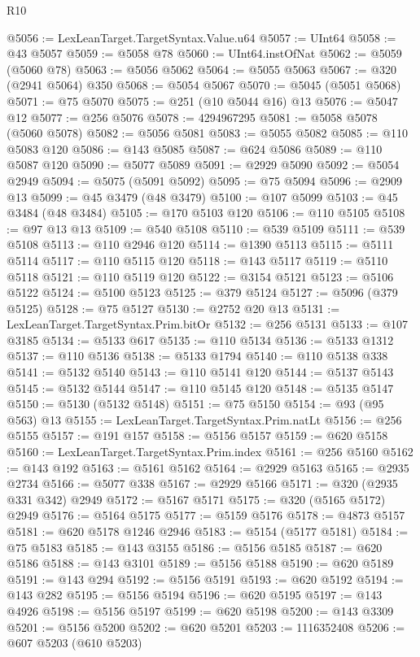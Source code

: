 \begin{lexlean}{R10}
\begin{coremodule}
@5056 := LexLeanTarget.TargetSyntax.Value.u64
@5057 := UInt64
@5058 := @43 @5057
@5059 := @5058 @78
@5060 := UInt64.instOfNat
@5062 := @5059 (@5060 @78)
@5063 := @5056 @5062
@5064 := @5055 @5063
@5067 := @320 (@2941 @5064) @350
@5068 := @5054 @5067
@5070 := @5045 (@5051 @5068)
@5071 := @75 @5070
@5075 := @251 (@10 @5044 @16) @13
@5076 := @5047 @12
@5077 := @256 @5076
@5078 := 4294967295
@5081 := @5058 @5078 (@5060 @5078)
@5082 := @5056 @5081
@5083 := @5055 @5082
@5085 := @110 @5083 @120
@5086 := @143 @5085
@5087 := @624 @5086
@5089 := @110 @5087 @120
@5090 := @5077 @5089
@5091 := @2929 @5090
@5092 := @5054 @2949
@5094 := @5075 (@5091 @5092)
@5095 := @75 @5094
@5096 := @2909 @13
@5099 := @45 @3479 (@48 @3479)
@5100 := @107 @5099
@5103 := @45 @3484 (@48 @3484)
@5105 := @170 @5103 @120
@5106 := @110 @5105
@5108 := @97 @13 @13
@5109 := @540 @5108
@5110 := @539 @5109
@5111 := @539 @5108
@5113 := @110 @2946 @120
@5114 := @1390 @5113
@5115 := @5111 @5114
@5117 := @110 @5115 @120
@5118 := @143 @5117
@5119 := @5110 @5118
@5121 := @110 @5119 @120
@5122 := @3154 @5121
@5123 := @5106 @5122
@5124 := @5100 @5123
@5125 := @379 @5124
@5127 := @5096 (@379 @5125)
@5128 := @75 @5127
@5130 := @2752 @20 @13
@5131 := LexLeanTarget.TargetSyntax.Prim.bitOr
@5132 := @256 @5131
@5133 := @107 @3185
@5134 := @5133 @617
@5135 := @110 @5134
@5136 := @5133 @1312
@5137 := @110 @5136
@5138 := @5133 @1794
@5140 := @110 @5138 @338
@5141 := @5132 @5140
@5143 := @110 @5141 @120
@5144 := @5137 @5143
@5145 := @5132 @5144
@5147 := @110 @5145 @120
@5148 := @5135 @5147
@5150 := @5130 (@5132 @5148)
@5151 := @75 @5150
@5154 := @93 (@95 @563) @13
@5155 := LexLeanTarget.TargetSyntax.Prim.natLt
@5156 := @256 @5155
@5157 := @191 @157
@5158 := @5156 @5157
@5159 := @620 @5158
@5160 := LexLeanTarget.TargetSyntax.Prim.index
@5161 := @256 @5160
@5162 := @143 @192
@5163 := @5161 @5162
@5164 := @2929 @5163
@5165 := @2935 @2734
@5166 := @5077 @338
@5167 := @2929 @5166
@5171 := @320 (@2935 @331 @342) @2949
@5172 := @5167 @5171
@5175 := @320 (@5165 @5172) @2949
@5176 := @5164 @5175
@5177 := @5159 @5176
@5178 := @4873 @5157
@5181 := @620 @5178 @1246 @2946
@5183 := @5154 (@5177 @5181)
@5184 := @75 @5183
@5185 := @143 @3155
@5186 := @5156 @5185
@5187 := @620 @5186
@5188 := @143 @3101
@5189 := @5156 @5188
@5190 := @620 @5189
@5191 := @143 @294
@5192 := @5156 @5191
@5193 := @620 @5192
@5194 := @143 @282
@5195 := @5156 @5194
@5196 := @620 @5195
@5197 := @143 @4926
@5198 := @5156 @5197
@5199 := @620 @5198
@5200 := @143 @3309
@5201 := @5156 @5200
@5202 := @620 @5201
@5203 := 1116352408
@5206 := @607 @5203 (@610 @5203)

\end{coremodule}
\end{lexlean}
